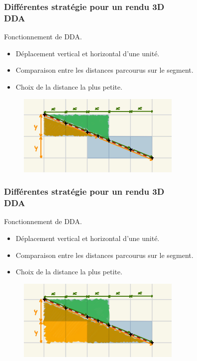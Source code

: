 \documentclass{beamer}
\begin{document}
\begin{frame}
    \frametitle{Différentes stratégie pour un rendu 3D \\
                \small DDA}           
    \begin{block}{Fonctionnement de DDA.}
        \begin{itemize}
            \item Déplacement vertical et horizontal d'une unité.
            \item Comparaison entre les distances parcourus sur le segment.
            \item Choix de la distance la plus petite.
        \end{itemize}
    \end{block}    
    \begin{figure}
        \centering
        \includegraphics[width=0.7\textwidth]{images/DDA 3.jpg}
    \end{figure}
\end{frame}

\begin{frame}
    \frametitle{Différentes stratégie pour un rendu 3D \\
                \small DDA}           
    \begin{block}{Fonctionnement de DDA.}
        \begin{itemize}
            \item Déplacement vertical et horizontal d'une unité.
            \item Comparaison entre les distances parcourus sur le segment.
            \item Choix de la distance la plus petite.
        \end{itemize}
    \end{block}    
    \begin{figure}
        \centering
        \includegraphics[width=0.7\textwidth]{images/DDA 4.jpg}
    \end{figure}
\end{frame}
\end{document}
